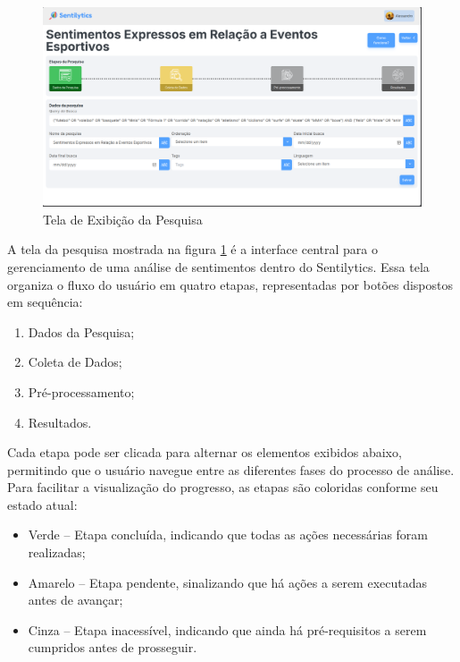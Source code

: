 \documentclass[
	12pt,				%
	oneside,			%
	a4paper,			%
	english,			%
	french,				%
	spanish,			%
	brazil				%
	]{abntex2}
\begin{document}
\begin{figure}[htbp]
\hypertarget{tela_dados_pesquisa}{%
\caption{Tela de Exibição da Pesquisa}\label{tela_dados_pesquisa}
\begin{center}
\includegraphics[scale=0.2]{imagens/sentilytics/interface-grafica/dados-pesquisa.png}
\end{center}
}
\end{figure}

A tela da pesquisa mostrada na figura \ref{tela_dados_pesquisa} é a
interface central para o gerenciamento de uma análise de sentimentos
dentro do Sentilytics. Essa tela organiza o fluxo do usuário em quatro
etapas, representadas por botões dispostos em sequência:

\begin{enumerate}
\def\labelenumi{\arabic{enumi})}
\tightlist
\item
  Dados da Pesquisa;
\item
  Coleta de Dados;
\item
  Pré-processamento;
\item
  Resultados.
\end{enumerate}

Cada etapa pode ser clicada para alternar os elementos exibidos abaixo,
permitindo que o usuário navegue entre as diferentes fases do processo
de análise. Para facilitar a visualização do progresso, as etapas são
coloridas conforme seu estado atual:

\begin{itemize}
\tightlist
\item
  Verde -- Etapa concluída, indicando que todas as ações necessárias
  foram realizadas;
\item
  Amarelo -- Etapa pendente, sinalizando que há ações a serem executadas
  antes de avançar;
\item
  Cinza -- Etapa inacessível, indicando que ainda há pré-requisitos a
  serem cumpridos antes de prosseguir.
\end{itemize}
\end{document}
